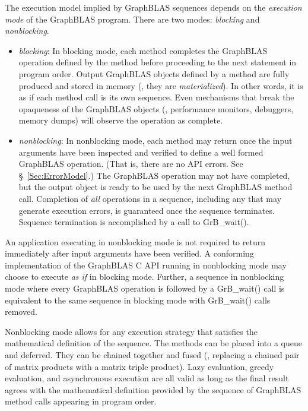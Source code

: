 The execution model
implied by GraphBLAS sequences depends on the \emph{execution mode} of the 
GraphBLAS program.  There are two modes: \emph{blocking} and \emph{nonblocking}.  
\begin{itemize}

\item \emph{blocking}: In blocking mode, each method completes the
GraphBLAS operation defined by the method before proceeding to the
next statement in program order.  Output GraphBLAS objects defined by a
method are fully produced and stored in  memory (\ie, they are
\emph{materialized}).  In other words, it is as if each method call is its own sequence.
Even mechanisms that break the opaqueness of the
GraphBLAS objects (\eg, performance monitors, debuggers, memory dumps)
will observe the operation as complete.

\item \emph{nonblocking}: In nonblocking mode, each method may return
once the input arguments have been inspected and verified to define a
well formed GraphBLAS operation. (That is, there are no API errors. See
\S~\ref{Sec:ErrorModel}.) The GraphBLAS operation may not have completed,
but the output object is ready to be used by the next GraphBLAS method
call.  Completion of \emph{all} operations in a sequence, including any that may generate execution
errors, is guaranteed once the sequence terminates.  Sequence termination is
accomplished by a call to  {\sf GrB\_wait()}.

\end{itemize}

An application executing in nonblocking mode is not required to return
immediately after input arguments have been verified. A conforming
implementation of the GraphBLAS C API running in nonblocking mode may
choose to execute {\it as if} in blocking mode.  Further, a sequence in
nonblocking mode where every GraphBLAS operation is followed by a {\sf
GrB\_wait()} call is equivalent to the same sequence in blocking mode
with {\sf GrB\_wait()} calls removed.

Nonblocking mode allows for any execution strategy that satisfies the
mathematical definition of the sequence.  The methods can be placed
into a queue and deferred.  They can be chained together and fused
(\eg, replacing a chained pair of matrix products with a matrix triple
product).  Lazy evaluation, greedy evaluation, and asynchronous execution
are all valid as long as the final result agrees with the mathematical
definition provided by the sequence of GraphBLAS method calls appearing
in  program order.

